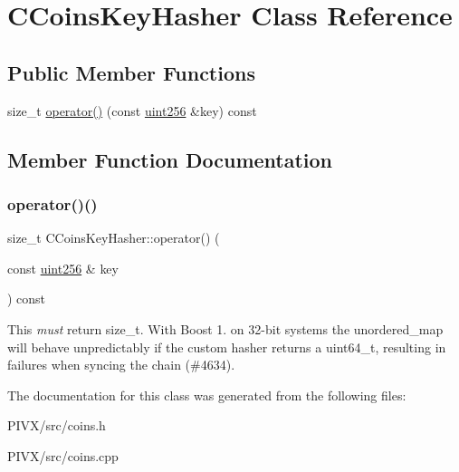 \hypertarget{class_c_coins_key_hasher}{}\section{C\+Coins\+Key\+Hasher Class Reference}
\label{class_c_coins_key_hasher}
\subsection*{Public Member Functions}
\begin{DoxyCompactItemize}
\item 
size\+\_\+t \mbox{\hyperlink{class_c_coins_key_hasher_abf805e5472a1a3c9c29f8f3f1dd013b3}{operator()}} (const \mbox{\hyperlink{classuint256}{uint256}} \&key) const
\end{DoxyCompactItemize}


\subsection{Member Function Documentation}
\mbox{\label{class_c_coins_key_hasher_abf805e5472a1a3c9c29f8f3f1dd013b3}} 
\subsubsection{\texorpdfstring{operator()()}{operator()()}}
{\footnotesize\ttfamily size\+\_\+t C\+Coins\+Key\+Hasher\+::operator() (\begin{DoxyParamCaption}\item[{const \mbox{\hyperlink{classuint256}{uint256}} \&}]{key }\end{DoxyParamCaption}) const\hspace{0.3cm}{\ttfamily [inline]}}

This {\itshape must} return size\+\_\+t. With Boost 1. on 32-\/bit systems the unordered\+\_\+map will behave unpredictably if the custom hasher returns a uint64\+\_\+t, resulting in failures when syncing the chain (\#4634). 

The documentation for this class was generated from the following files\+:\begin{DoxyCompactItemize}
\item 
P\+I\+V\+X/src/coins.\+h\item 
P\+I\+V\+X/src/coins.\+cpp\end{DoxyCompactItemize}
